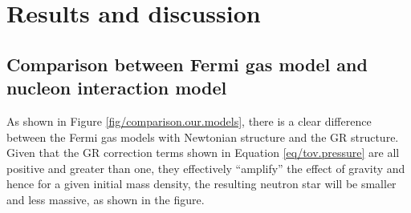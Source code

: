 \documentclass[draft,11pt]{article}
\theoremstyle{definition}
\theoremstyle{remark}
\begin{document}
    \section{Results and discussion}
        \subsection{Comparison between Fermi gas model and nucleon interaction model}
            As shown in Figure \ref{fig/comparison.our.models}, there is a clear difference between the Fermi gas models with Newtonian structure and the GR structure. Given that the GR correction terms shown in Equation \ref{eq/tov.pressure} are all positive and greater than one, they effectively ``amplify'' the effect of gravity \parencite{silbar.reddy.2004/neutron.stars} and hence for a given initial mass density, the resulting neutron star will be smaller and less massive, as shown in the figure.
            
\end{document}
